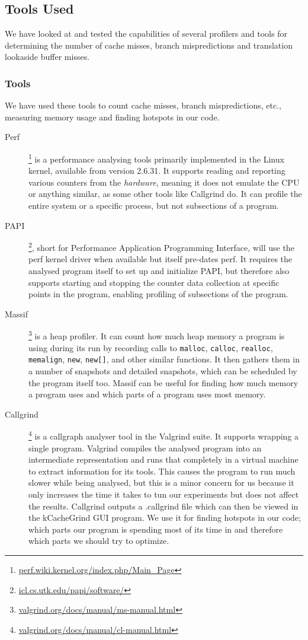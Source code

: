 \subsection{Tools Used}
We have looked at and tested the capabilities of several profilers and tools for determining the number of cache misses, branch mispredictions and translation lookaside buffer misses.


\subsubsection{Tools}
We have used these tools to count cache misses, branch mispredictions, etc., measuring memory usage and finding hotspots in our code.
\begin{description}
\item[Perf]\footnote{\url{perf.wiki.kernel.org/index.php/Main_Page}} is a performance analysing tools primarily implemented in the Linux kernel, available from version 2.6.31.
It supports reading and reporting various counters from the \textit{hardware}, meaning it does not emulate the CPU or anything similar, as some other tools like Callgrind do.
It can profile the entire system or a specific process, but not subsections of a program.
\item[PAPI]\footnote{\url{icl.cs.utk.edu/papi/software/}}, short for Performance Application Programming Interface, will use the perf kernel driver when available but itself pre-dates perf.
It requires the analysed program itself to set up and initialize PAPI, but therefore also supports starting and stopping the counter data collection at specific points in the program, enabling profiling of subsections of the program.
\item[Massif]\footnote{\url{valgrind.org/docs/manual/ms-manual.html}} is a heap profiler. It can count how much heap memory a program is using during its run by recording calls to \texttt{malloc}, \texttt{calloc}, \texttt{realloc}, \texttt{memalign}, \texttt{new}, \texttt{new[]}, and other similar functions.
It then gathers them in a number of snapshots and detailed snapshots, which can be scheduled by the program itself too.
Massif can be useful for finding how much memory a program uses and which parts of a program uses most memory.
\item[Callgrind]\footnote{\url{valgrind.org/docs/manual/cl-manual.html}} is a callgraph analyser tool in the Valgrind suite.
It supports wrapping a single program.
Valgrind compiles the analysed program into an intermediate representation and runs that completely in a virtual machine to extract information for its tools.
This causes the program to run much slower while being analysed, but this is a minor concern for us because it only increases the time it takes to tun our experiments but does not affect the results.
Callgrind outputs a .callgrind file which can then be viewed in the kCacheGrind GUI program.
We use it for finding hotspots in our code; which parts our program is spending most of its time in and therefore which parts we should try to optimize.
\end{description}

